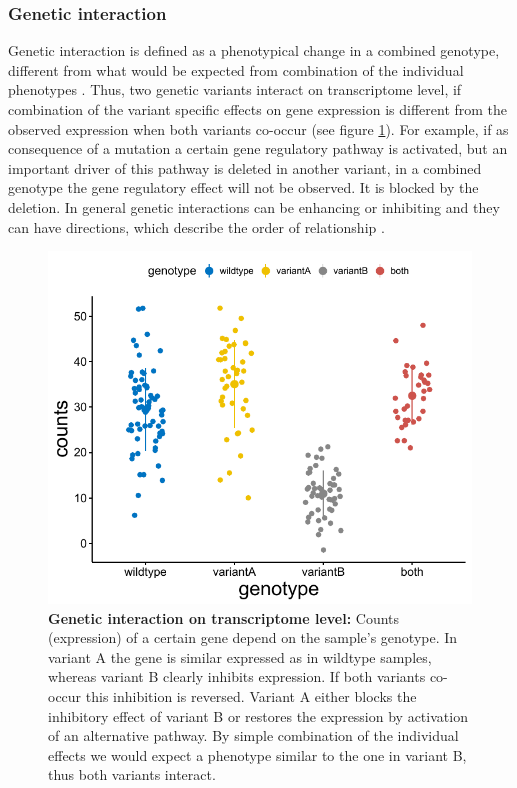 \subsubsection{Genetic interaction}
Genetic interaction is defined as a phenotypical change in a combined genotype, different from what would be expected from combination of the individual phenotypes \citep{Fisher1919}. Thus, two genetic variants interact on transcriptome level, if combination of the variant specific effects on gene expression is different from the observed expression when both variants co-occur (see figure \ref{fig:geneticInteraction}). For example, if as consequence of a mutation a certain gene regulatory pathway is activated, but an important driver of this pathway is deleted in another variant, in a combined genotype the gene regulatory effect will not be observed. It is blocked by the deletion. In general genetic interactions can be enhancing or inhibiting and they can have directions, which describe the order of relationship \citep{Fischer2015}.

\FloatBarrier

\begin{figure}
	\centering
	\includegraphics[width=0.8\columnwidth]{./Figures/genetic_interaction_concept.pdf}
	\caption{\textbf{Genetic interaction on transcriptome level:} Counts (expression) of a certain gene depend on the sample's genotype. In variant A the gene is similar expressed as in wildtype samples, whereas variant B clearly inhibits expression. If both variants co-occur this inhibition is reversed. Variant A either blocks the inhibitory effect of variant B or restores the expression by activation of an alternative pathway. By simple combination of the individual effects we would expect a phenotype similar to the one in variant B, thus both variants interact.}
	\label{fig:geneticInteraction}
\end{figure}

